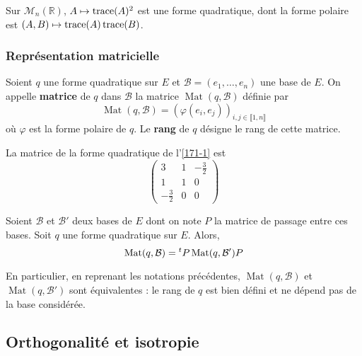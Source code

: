 	
	\begin{example}
		Sur $\mathcal{M}_n(\mathbb{R})$, $A \mapsto \operatorname{trace}(A)^2$ est une forme quadratique, dont la forme polaire est $(A, B) \mapsto \operatorname{trace}(A)\operatorname{trace}(B)$.
	\end{example}
	
	\subsubsection{Représentation matricielle}
	
	
	\begin{definition}
		Soient $q$ une forme quadratique sur $E$ et $\mathcal{B} = (e_1, \dots, e_n)$ une base de $E$. On appelle \textbf{matrice} de $q$ dans $\mathcal{B}$ la matrice $\operatorname{Mat}(q, \mathcal{B})$ définie par
		\[ \operatorname{Mat}(q, \mathcal{B}) = (\varphi(e_i, e_j))_{i, j \in \llbracket 1, n \rrbracket} \]
		où $\varphi$ est la forme polaire de $q$. Le \textbf{rang} de $q$ désigne le rang de cette matrice.
	\end{definition}
	
	\begin{example}
		La matrice de la forme quadratique de l'\cref{171-1} est
		\[
		\begin{pmatrix}
			3 & 1 & -\frac{3}{2} \\
			1 & 1 & 0 \\
			-\frac{3}{2} & 0 & 0
		\end{pmatrix}
		\]
	\end{example}
	
	\begin{proposition}
		Soient $\mathcal{B}$ et $\mathcal{B}'$ deux bases de $E$ dont on note $P$ la matrice de passage entre ces bases. Soit $q$ une forme quadratique sur $E$. Alors,
		\[ \operatorname{Mat}(q, \mathcal{B}) = \mathstrut ^t P \operatorname{Mat}(q, \mathcal{B}') P \]
	\end{proposition}
	
	\begin{remark}
		En particulier, en reprenant les notations précédentes, $\operatorname{Mat}(q, \mathcal{B})$ et $\operatorname{Mat}(q, \mathcal{B}')$ sont équivalentes : le rang de $q$ est bien défini et ne dépend pas de la base considérée.
	\end{remark}
	
	\subsection{Orthogonalité et isotropie}
	
